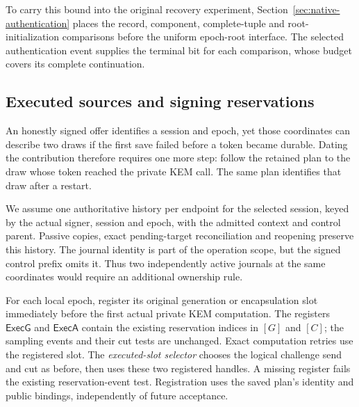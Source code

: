 \documentclass[pdflatex]{sn-jnl}
\theoremstyle{thmstyleone}
\theoremstyle{thmstylethree}
\theoremstyle{thmstyletwo}
\begin{document}
To carry this bound into the original recovery experiment,
Section~\ref{sec:native-authentication} places the record, component,
complete-tuple and root-initialization comparisons before the uniform
epoch-root interface. The selected authentication event supplies the
terminal bit for each comparison, whose budget covers its complete
continuation.
\subsection{Executed sources and signing reservations}
\label{sec:executed-source-attribution}

An honestly signed offer identifies a session and epoch, yet those
coordinates can describe two draws if the first save failed before a
token became durable. Dating the contribution therefore requires one
more step: follow the retained plan to the draw whose token reached
the private KEM call. The same plan identifies that draw after a restart.

We assume one authoritative history per endpoint for the selected session,
keyed by the actual signer, session and epoch, with the admitted context
and control parent. Passive copies, exact pending-target reconciliation
and reopening preserve this history. The journal identity is part of the
operation scope, but the signed control prefix omits it. Thus two independently
active journals at the same coordinates would require an additional
ownership rule.

For each local epoch, register its original generation or encapsulation
slot immediately before the first actual private KEM computation. The
registers $\mathsf{ExecG}$ and $\mathsf{ExecA}$ contain the existing
reservation indices in $[G]$ and $[C]$; the sampling events and their cut
tests are unchanged. Exact computation retries use the registered slot.
The \emph{executed-slot selector} chooses the logical challenge send and
cut as before, then uses these two registered handles. A missing register
fails the existing reservation-event test. Registration uses the saved
plan's identity and public bindings, independently of future acceptance.
\end{document}
